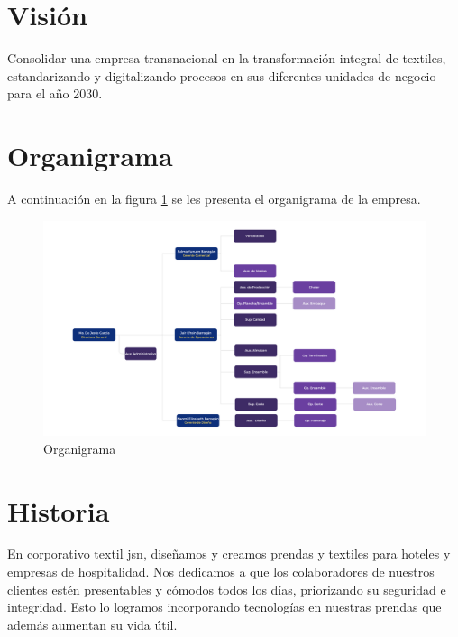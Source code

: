 \documentclass[12pt,letterpaper,spanish]{report}
\begin{document}
\section{Visión}
Consolidar una empresa transnacional en la transformación integral de textiles, estandarizando y digitalizando procesos en sus diferentes unidades de negocio para el año 2030.

\section{Organigrama}
A continuación en la figura \ref{a2} se les presenta el organigrama de la empresa.

\begin{figure}[htp]
  \centering
  \includegraphics[width=\linewidth]{Organigrama_Jasana3.png}
  \caption{Organigrama}\label{a2}
\end{figure}

\section{Historia}
En corporativo textil jsn, diseñamos y creamos prendas y textiles para hoteles y empresas de hospitalidad.
Nos dedicamos a que los colaboradores de nuestros clientes estén presentables y cómodos todos los días, priorizando su seguridad e integridad.
Esto lo logramos incorporando tecnologías en nuestras prendas que además aumentan su vida útil.


\newpage

\end{document}
